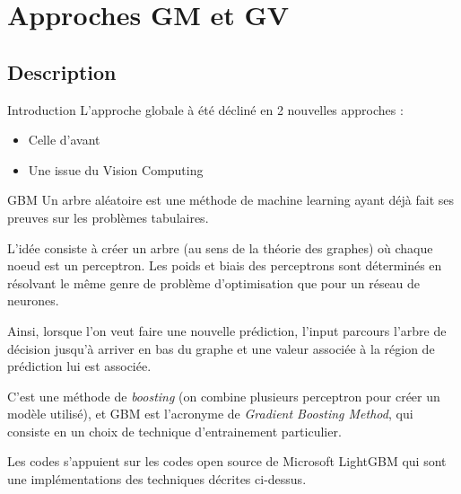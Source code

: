 \documentclass[
11pt,notheorems,hyperref={pdfauthor=whatever}
]{beamer}
\begin{document}


\section{Approches GM et GV}

\subsection{Description}

\begin{frame}{Introduction}
    L'approche globale à été décliné en 2 nouvelles approches : 
    \begin{itemize}
        \item Celle d'avant
        \item Une issue du Vision Computing
    \end{itemize}
\end{frame}

\begin{frame}{GBM}
    Un arbre aléatoire est une méthode de machine learning ayant déjà fait ses preuves sur les problèmes tabulaires. 
    
    \vspace{0.2cm}

    L'idée consiste à créer un arbre (au sens de la théorie des graphes) où chaque noeud est un perceptron. Les poids et biais des perceptrons sont déterminés en résolvant le même genre de problème 
    d'optimisation que pour un réseau de neurones. 
   
    \vspace{0.2cm}

    Ainsi, lorsque l'on veut faire une nouvelle prédiction, l'input parcours l'arbre de décision
    jusqu'à arriver en bas du graphe et une valeur associée à la région de prédiction lui est associée. 
   
    \vspace{0.2cm}

    C'est une méthode de \textit{boosting} (on combine plusieurs perceptron pour créer un modèle utilisé), et GBM est l'acronyme de 
    \textit{Gradient Boosting Method}, qui consiste en un choix de technique d'entrainement particulier.

    \vspace{0.2cm}
    
    Les codes s'appuient sur les codes open source de Microsoft LightGBM qui sont une implémentations des techniques décrites ci-dessus.
    
\end{frame}
\end{document}
